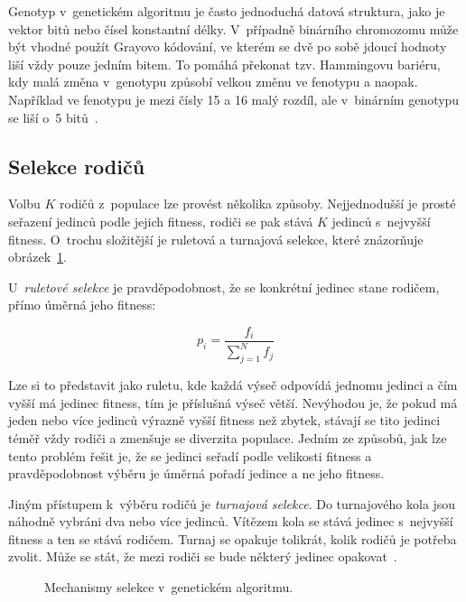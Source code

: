 Genotyp v~genetickém algoritmu je často jednoduchá datová struktura, jako je vektor bitů nebo čísel konstantní délky. V~případně binárního chromozomu může být vhodné použít Grayovo kódování, ve kterém se dvě po sobě jdoucí hodnoty liší vždy pouze jedním bitem. To pomáhá překonat tzv. Hammingovu bariéru, kdy malá změna v~genotypu způsobí velkou změnu ve fenotypu a naopak. Například ve fenotypu je mezi čísly 15 a 16 malý rozdíl, ale v~binárním genotypu se liší o~5 bitů~\cite{HandbookGA}.


\subsection{Selekce rodičů}

Volbu $K$ rodičů z~populace lze provést několika způsoby. Nejjednodušší je prosté seřazení jedinců podle jejich fitness, rodiči se pak stává $K$ jedinců s~nejvyšší fitness. O~trochu složitější je ruletová a turnajová selekce, které znázorňuje obrázek~\ref{obrSelekce}.

U~\emph{ruletové selekce} je pravděpodobnost, že se konkrétní jedinec stane rodičem, přímo úměrná jeho fitness:

\begin{equation}
p_i = \frac{f_i}{\sum_{j=1}^N{f_j}}
\end{equation}

\noindent{}Lze si to představit jako ruletu, kde každá výseč odpovídá jednomu jedinci a čím vyšší má jedinec fitness, tím je příslušná výseč větší. Nevýhodou je, že pokud má jeden nebo více jedinců výrazně vyšší fitness než zbytek, stávají se tito jedinci téměř vždy rodiči a zmenšuje se diverzita populace. Jedním ze způsobů, jak lze tento problém řešit je, že se jedinci seřadí podle velikosti fitness a pravděpodobnost výběru je úměrná pořadí jedince a ne jeho fitness.

Jiným přístupem k~výběru rodičů je \emph{turnajová selekce}. Do turnajového kola jsou náhodně vybráni dva nebo více jedinců. Vítězem kola se stává jedinec s~nejvyšší fitness a ten se stává rodičem. Turnaj se opakuje tolikrát, kolik rodičů je potřeba zvolit. Může se stát, že mezi rodiči se bude některý jedinec opakovat~\cite{Modra}.


\begin{figure}[hbt]
    \centering
    \hfill
    \hfill
    \caption{Mechanismy selekce v~genetickém algoritmu.}
    \label{obrSelekce}
\end{figure}




